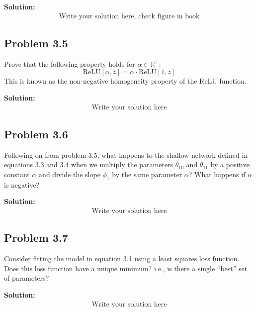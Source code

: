 \documentclass{article}
\begin{document}
        \vspace{1cm}
        \textbf{Solution:}
        \begin{align*}
            \text{Write your solution here, check figure in book}
        \end{align*}

    \subsection*{Problem 3.5}
    Prove that the following property holds for $\alpha \in \mathbb{R^+}$:
    \begin{equation}
        \text{ReLU}[\alpha, z] = \alpha \cdot \text{ReLU}[1, z]
        \tag{3.14}
    \end{equation}
    This is known as the non-negative homogeneity property of the ReLU function.

        \vspace{1cm}
        \textbf{Solution:}
        \begin{align*}
            \text{Write your solution here}
        \end{align*}

    \subsection*{Problem 3.6}
    Following on from problem 3.5, what happens to the shallow network defined in equations 3.3 and 3.4 when we multiply the parameters $\theta_{10}$ and $\theta_{11}$ by a positive constant $\alpha$ and divide the slope $\phi_1$ by the same parameter $\alpha$? What happens if $\alpha$ is negative?

        \vspace{1cm}
        \textbf{Solution:}
        \begin{align*}
            \text{Write your solution here}
        \end{align*}

    \subsection*{Problem 3.7}
    Consider fitting the model in equation 3.1 using a least squares loss function. Does this loss function have a unique minimum? i.e., is there a single ``best'' set of parameters?

        \vspace{1cm}
        \textbf{Solution:}
        \begin{align*}
            \text{Write your solution here}
        \end{align*}
\end{document}
